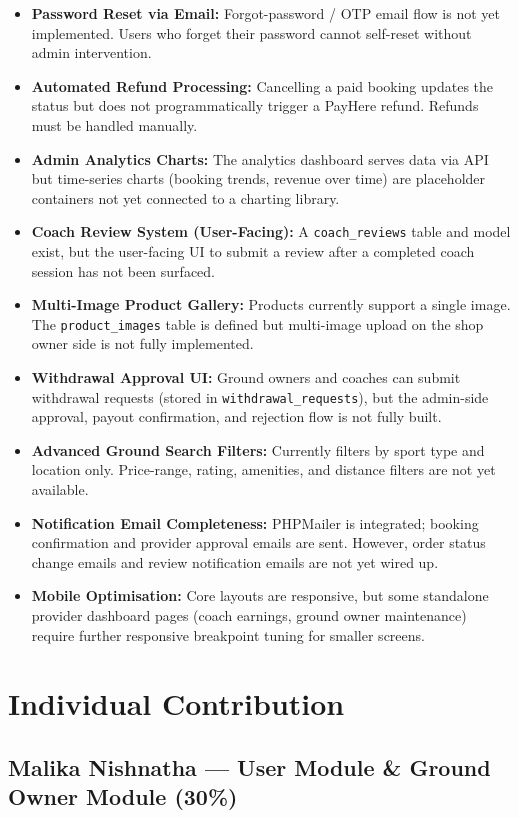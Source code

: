 \documentclass[12pt,a4paper]{report}
\begin{document}
\begin{itemize}[leftmargin=1.5cm]
  \item \textbf{Password Reset via Email:} Forgot-password / OTP email flow is not yet implemented. Users who forget their password cannot self-reset without admin intervention.
  \item \textbf{Automated Refund Processing:} Cancelling a paid booking updates the status but does not programmatically trigger a PayHere refund. Refunds must be handled manually.
  \item \textbf{Admin Analytics Charts:} The analytics dashboard serves data via API but time-series charts (booking trends, revenue over time) are placeholder containers not yet connected to a charting library.
  \item \textbf{Coach Review System (User-Facing):} A \texttt{coach\_reviews} table and model exist, but the user-facing UI to submit a review after a completed coach session has not been surfaced.
  \item \textbf{Multi-Image Product Gallery:} Products currently support a single image. The \texttt{product\_images} table is defined but multi-image upload on the shop owner side is not fully implemented.
  \item \textbf{Withdrawal Approval UI:} Ground owners and coaches can submit withdrawal requests (stored in \texttt{withdrawal\_requests}), but the admin-side approval, payout confirmation, and rejection flow is not fully built.
  \item \textbf{Advanced Ground Search Filters:} Currently filters by sport type and location only. Price-range, rating, amenities, and distance filters are not yet available.
  \item \textbf{Notification Email Completeness:} PHPMailer is integrated; booking confirmation and provider approval emails are sent. However, order status change emails and review notification emails are not yet wired up.
  \item \textbf{Mobile Optimisation:} Core layouts are responsive, but some standalone provider dashboard pages (coach earnings, ground owner maintenance) require further responsive breakpoint tuning for smaller screens.
\end{itemize}

\section{Individual Contribution}

\subsection{Malika Nishnatha --- User Module \& Ground Owner Module (30\%)}
\end{document}
